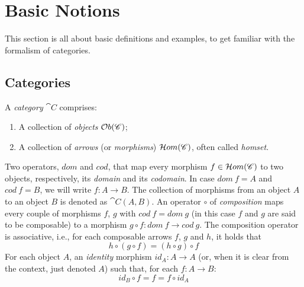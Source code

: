 
\section{Basic Notions}\label{sect:basic_nots}


This section is all about basic definitions and examples, to get familiar with the formalism of categories.

\subsection{Categories}\label{ssect:cats}

\begin{definition}[Category]\label{def:category}
    A \emph{category} $\cat{C}$ comprises:
    \begin{enumerate}
        \item A collection of \emph{objects} $\mathcal{O}b(\mathscr{C})$;
        \item A collection of \emph{arrows} (or \emph{morphisms}) $\mathcal{H}om(\mathscr{C})$, often called \emph{homset}.
    \end{enumerate}
    Two operators, $dom$ and $cod$, that map every morphism \-$f \in \mathcal{H}om(\mathscr{C})$ to two objects, respectively, its \emph{domain} and its \emph{codomain}. In case $dom\ f = A$ and $cod\ f = B$, we will write $f: A \rightarrow B$. The collection of morphisms from an object $A$ to an object $B$ is denoted as $\cat{C}(A, B)$.
    An operator $\circ$ of \emph{composition} maps every couple of morphisms $f$, $g$ with $cod\ f = dom \ g$ (in this case $f$ and $g$ are said to be composable) to a morphism $g \circ f : dom\ f \rightarrow cod \ g$. The composition operator is associative, i.e., for each composable arrows $f$, $g$ and $h$, it holds that
    $$
        h \circ (g \circ f) = (h\circ g) \circ f
    $$
    For each object $A$, an \emph{identity} morphism $id_A : A \rightarrow A$ (or, when it is clear from the context, just denoted $A$)  such that, for each $f: A \rightarrow B$:
    \[
        id_B \circ f = f = f \circ id_A 
    \]
\end{definition}

